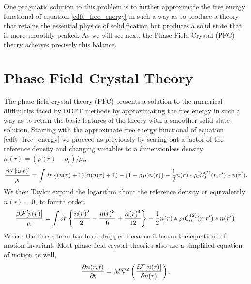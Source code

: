 One pragmatic solution to this problem is to further approximate the free
energy functional of equation \ref{cdft_free_energy} in such a way as to
produce a theory that retains the essential physics of solidification but
produces a solid state that is more smoothly peaked. As we will see next,
the Phase Field Crystal (PFC) theory acheives precisely this balance.

\section{Phase Field Crystal Theory} %

The phase field crystal theory (PFC) presents a solution to the numerical
difficulties faced by DDFT methods by approximating the free energy in such a
way as to retain the basic features of the theory with a smoother solid state
solution. Starting with the approximate free energy functional of equation
\ref{cdft_free_energy} we proceed as previously by scaling out a factor of the
reference density and changing variables to a dimensionless density $n(r) =
(\rho(r) - \rho_l) / \rho_l$,
%
\begin{equation}
    \frac{\beta \mathcal{F}[n(r)]}{\rho_l} = 
        \int dr \left\lbrace (n(r) + 1) \ln( n(r) + 1) - (1 - \beta\mu)n(r) \right\rbrace
        - \frac{1}{2} n(r) \ast \rho_l C^{(2)}_0(r, r^\prime) \ast n(r^\prime).
\end{equation}
%
We then Taylor expand the logarithm about the reference density or equivalently
$n(r) = 0$, to fourth order,
%
\begin{equation}
    \label{pfc_free_energy} 
    \frac{\beta \mathcal{F}[n(r)]}{\rho_l} =
        \int dr \left\lbrace \frac{n(r)^2}{2} - \frac{n(r)^3}{6} + \frac{n(r)^4}{12} \right\rbrace
        -\frac{1}{2} n(r) \ast \rho_l C^{(2)}_0(r, r^\prime) \ast n(r^\prime).
\end{equation}
%
Where the linear term has been dropped because it leaves the equations of
motion invariant.  Most phase field crystal theories also use a simplified
equation of motion as well,
%
\begin{equation}
    \label{pfc_eom}
    \frac{\partial n(r, t)}{\partial t} = M \nabla^2 \left(\frac{\delta \mathcal{F}[n(r)]}{\delta n(r)}\right).
\end{equation}
%
